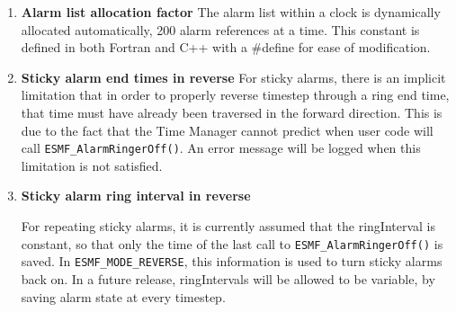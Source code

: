 
\begin{enumerate}

\item {\bf Alarm list allocation factor}  The alarm list within a clock is
dynamically allocated automatically, 200 alarm references at a time.
This constant is defined in both Fortran and C++ with a \#define for ease
of modification.

\item {\bf Sticky alarm end times in reverse}  For sticky alarms, there is
an implicit limitation that in order to properly reverse timestep through a
ring end time, that time must have already been traversed in the forward
direction.  This is due to the fact that the Time Manager cannot predict
when user code will call {\tt ESMF\_AlarmRingerOff()}.  An error message
will be logged when this limitation is not satisfied.

\item {\bf Sticky alarm ring interval in reverse}  
\begin{sloppypar}
For repeating sticky alarms,
it is currently assumed that the ringInterval is constant, so that only the
time of the last call to {\tt ESMF\_AlarmRingerOff()} is saved.  In
{\tt ESMF\_MODE\_REVERSE}, this information is used to turn sticky alarms
back on.  In a future release, ringIntervals will be allowed to be variable,
by saving alarm state at every timestep.
\end{sloppypar}

\end{enumerate}
